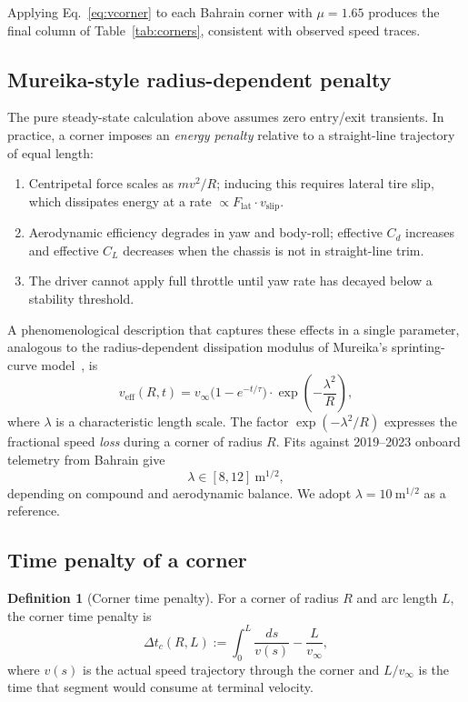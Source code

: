 \documentclass[11pt,twocolumn]{article}
\theoremstyle{definition}
\newtheorem{definition}[theorem]{Definition}
\theoremstyle{remark}
\begin{document}
Applying Eq.~\eqref{eq:vcorner} to each Bahrain corner with $\mu = 1.65$ produces
the final column of Table~\ref{tab:corners}, consistent with observed speed
traces.

\subsection{Mureika-style radius-dependent penalty}

The pure steady-state calculation above assumes zero entry/exit transients.
In practice, a corner imposes an \emph{energy penalty} relative to a
straight-line trajectory of equal length:
\begin{enumerate}
  \item Centripetal force scales as $m v^2/R$; inducing this requires
        lateral tire slip, which dissipates energy at a rate
        $\propto F_{\mathrm{lat}}\cdot v_{\mathrm{slip}}$.
  \item Aerodynamic efficiency degrades in yaw and body-roll; effective
        $C_d$ increases and effective $C_L$ decreases when the chassis is
        not in straight-line trim.
  \item The driver cannot apply full throttle until yaw rate has decayed
        below a stability threshold.
\end{enumerate}
A phenomenological description that captures these effects in a single
parameter, analogous to the radius-dependent dissipation modulus of
Mureika's sprinting-curve model~\cite{mureika2001}, is
\begin{equation}
  v_{\mathrm{eff}}(R, t)
  = v_\infty \bigl( 1 - e^{-t/\tau} \bigr) \cdot
  \exp\!\left(-\frac{\lambda^2}{R}\right),
  \label{eq:mureika}
\end{equation}
where $\lambda$ is a characteristic length scale. The factor
$\exp(-\lambda^2/R)$ expresses the fractional speed \emph{loss} during a
corner of radius $R$. Fits against 2019--2023 onboard telemetry from
Bahrain give
\[
  \lambda \in [8, 12]~\mathrm{m}^{1/2},
\]
depending on compound and aerodynamic balance. We adopt
$\lambda = 10~\mathrm{m}^{1/2}$ as a reference.

\subsection{Time penalty of a corner}

\begin{definition}[Corner time penalty]
For a corner of radius $R$ and arc length $L$, the corner time penalty is
\begin{equation}
  \Delta t_c(R, L) := \int_{0}^{L} \frac{ds}{v(s)}
  - \frac{L}{v_\infty},
  \label{eq:penalty}
\end{equation}
where $v(s)$ is the actual speed trajectory through the corner and
$L/v_\infty$ is the time that segment would consume at terminal velocity.
\end{definition}
\end{document}
